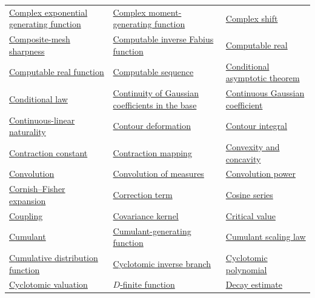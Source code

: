 \documentclass[11pt,oneside]{article}
\begin{document}
\begin{longtable}{L{0.31\textwidth}L{0.31\textwidth}L{0.31\textwidth}}
\hyperlink{gls:complex-exponential-generating-function}{Complex exponential generating function} & \hyperlink{gls:complex-moment-generating-function}{Complex moment-generating function} & \hyperlink{gls:complex-shift}{Complex shift} \\
\hyperlink{gls:composite-mesh-sharpness}{Composite-mesh sharpness} & \hyperlink{gls:computable-fabius-inverse}{Computable inverse Fabius function} & \hyperlink{gls:computable-real}{Computable real} \\
\hyperlink{gls:computable-real-function}{Computable real function} & \hyperlink{gls:computable-sequence}{Computable sequence} & \hyperlink{gls:conditional-asymptotic}{Conditional asymptotic theorem} \\
\hyperlink{gls:conditional-law}{Conditional law} & \hyperlink{gls:gaussian-binomial-continuity}{Continuity of Gaussian coefficients in the base} & \hyperlink{gls:continuous-gaussian-coefficient}{Continuous Gaussian coefficient} \\
\hyperlink{gls:continuous-linear-naturality}{Continuous-linear naturality} & \hyperlink{gls:contour-deformation}{Contour deformation} & \hyperlink{gls:contour-integral}{Contour integral} \\
\hyperlink{gls:contraction-constant}{Contraction constant} & \hyperlink{gls:contraction-mapping}{Contraction mapping} & \hyperlink{gls:convexity-and-concavity}{Convexity and concavity} \\
\hyperlink{gls:convolution}{Convolution} & \hyperlink{gls:convolution-measure}{Convolution of measures} & \hyperlink{gls:convolution-power}{Convolution power} \\
\hyperlink{gls:cornish-fisher-expansion}{Cornish--Fisher expansion} & \hyperlink{gls:correction-term}{Correction term} & \hyperlink{gls:cosine-series}{Cosine series} \\
\hyperlink{gls:coupling}{Coupling} & \hyperlink{gls:covariance-kernel}{Covariance kernel} & \hyperlink{gls:critical-value}{Critical value} \\
\hyperlink{gls:cumulant}{Cumulant} & \hyperlink{gls:cumulant-generating-function}{Cumulant-generating function} & \hyperlink{gls:cumulant-scaling-law}{Cumulant scaling law} \\
\hyperlink{gls:cumulative-distribution-function}{Cumulative distribution function} & \hyperlink{gls:cyclotomic-inverse-branch}{Cyclotomic inverse branch} & \hyperlink{gls:cyclotomic-polynomial}{Cyclotomic polynomial} \\
\hyperlink{gls:cyclotomic-valuation}{Cyclotomic valuation} & \hyperlink{gls:d-finite-function}{\(D\)-finite function} & \hyperlink{gls:decay-estimate}{Decay estimate} \\

\end{longtable}
\end{document}
